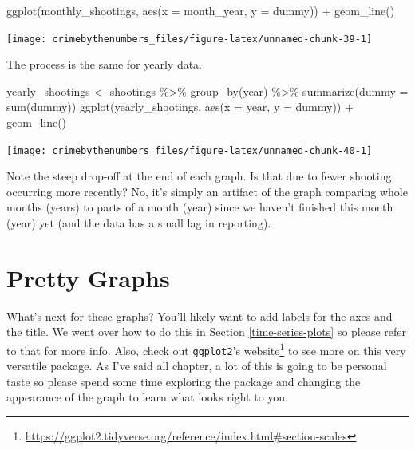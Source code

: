 \documentclass[
]{krantz}
\makeatletter
\newenvironment{Shaded}{\begin{snugshade}}{\end{snugshade}}
\newcommand{\AttributeTok}[1]{\textcolor[rgb]{0.61,0.61,0.61}{#1}}
\newcommand{\FunctionTok}[1]{\textcolor[rgb]{0,0,0}{#1}}
\newcommand{\NormalTok}[1]{#1}
\newcommand{\OtherTok}[1]{\textcolor[rgb]{0.37,0.37,0.37}{#1}}
\newcommand{\SpecialCharTok}[1]{\textcolor[rgb]{0,0,0}{#1}}
\renewcommand{\href}[2]{#2\footnote{\url{#1}}}
\newenvironment{kframe}{%
\medskip{}
\setlength{\fboxsep}{.8em}
 \def\at@end@of@kframe{}%
 \ifinner\ifhmode%
  \def\at@end@of@kframe{\end{minipage}}%
  \begin{minipage}{\columnwidth}%
 \fi\fi%
 \def\FrameCommand##1{\hskip\@totalleftmargin \hskip-\fboxsep
 \colorbox{shadecolor}{##1}\hskip-\fboxsep
     \hskip-\linewidth \hskip-\@totalleftmargin \hskip\columnwidth}%
 \MakeFramed {\advance\hsize-\width
   \@totalleftmargin\z@ \linewidth\hsize
   \@setminipage}}%
 {\par\unskip\endMakeFramed%
 \at@end@of@kframe}
\renewenvironment{Shaded}{\begin{kframe}}{\end{kframe}}
\makeatother
\begin{document}
\begin{Shaded}
\begin{Highlighting}[]
\FunctionTok{ggplot}\NormalTok{(monthly\_shootings, }\FunctionTok{aes}\NormalTok{(}\AttributeTok{x =}\NormalTok{ month\_year, }\AttributeTok{y =}\NormalTok{ dummy)) }\SpecialCharTok{+}
  \FunctionTok{geom\_line}\NormalTok{()}
\end{Highlighting}
\end{Shaded}

\begin{center}\texttt{[image: crimebythenumbers\_files/figure-latex/unnamed-chunk-39-1]} \end{center}

The process is the same for yearly data.

\begin{Shaded}
\begin{Highlighting}[]
\NormalTok{yearly\_shootings }\OtherTok{\textless{}{-}}\NormalTok{ shootings }\SpecialCharTok{\%\textgreater{}\%}
  \FunctionTok{group\_by}\NormalTok{(year) }\SpecialCharTok{\%\textgreater{}\%} 
  \FunctionTok{summarize}\NormalTok{(}\AttributeTok{dummy =} \FunctionTok{sum}\NormalTok{(dummy))}
\FunctionTok{ggplot}\NormalTok{(yearly\_shootings, }\FunctionTok{aes}\NormalTok{(}\AttributeTok{x =}\NormalTok{ year, }\AttributeTok{y =}\NormalTok{ dummy)) }\SpecialCharTok{+}
  \FunctionTok{geom\_line}\NormalTok{()}
\end{Highlighting}
\end{Shaded}

\begin{center}\texttt{[image: crimebythenumbers\_files/figure-latex/unnamed-chunk-40-1]} \end{center}

Note the steep drop-off at the end of each graph. Is that due to fewer shooting occurring more recently? No, it's simply an artifact of the graph comparing whole months (years) to parts of a month (year) since we haven't finished this month (year) yet (and the data has a small lag in reporting).

\hypertarget{pretty-graphs}{%
\section{Pretty Graphs}\label{pretty-graphs}}

What's next for these graphs? You'll likely want to add labels for the axes and the title. We went over how to do this in Section \ref{time-series-plots} so please refer to that for more info. Also, check out \texttt{ggplot2}'s \href{https://ggplot2.tidyverse.org/reference/index.html\#section-scales}{website} to see more on this very versatile package. As I've said all chapter, a lot of this is going to be personal taste so please spend some time exploring the package and changing the appearance of the graph to learn what looks right to you.
\end{document}

